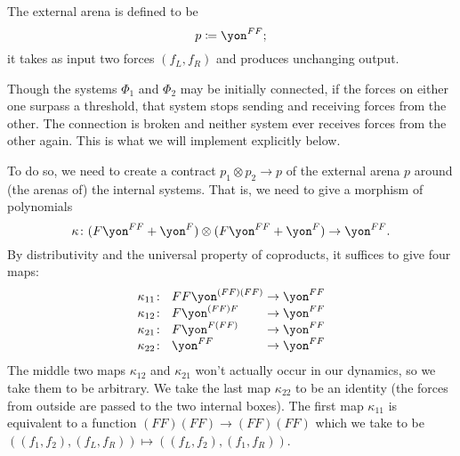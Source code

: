 \documentclass[Book-Poly]{subfiles}
\begin{document}
\begin{example}
The external arena is defined to be
\[
p\coloneqq\yon^{FF};
\]
it takes as input two forces $(f_L, f_R)$ and produces unchanging output.

Though the systems $\Phi_1$ and $\Phi_2$ may be initially connected, if the forces on either one surpass a threshold, that system stops sending and receiving forces from the other. The connection is broken and neither system ever receives forces from the other again. This is what we will implement explicitly below.

To do so, we need to create a contract $p_1\otimes p_2\to p$ of the external arena $p$ around (the arenas of) the internal systems. That is, we need to give a morphism of polynomials
\[
\kappa\colon (F\yon^{FF}+\yon^F)\otimes (F\yon^{FF}+\yon^F)\to\yon^{FF}.
\]
By distributivity and the universal property of coproducts, it suffices to give four maps:
\[\arraycolsep=1.4pt
\begin{array}{lll}
	\kappa_{11}\colon&~ FF\yon^{(FF)(FF)}&\to\yon^{FF}\\
	\kappa_{12}\colon&~ F\yon^{(FF)F}&\to\yon^{FF}\\
	\kappa_{21}\colon&~ F\yon^{F(FF)}&\to\yon^{FF}\\
	\kappa_{22}\colon&~ \yon^{FF}&\to\yon^{FF}
\end{array}
\]
The middle two maps $\kappa_{12}$ and $\kappa_{21}$ won't actually occur in our dynamics, so we take them to be arbitrary. We take the last map $\kappa_{22}$ to be an identity (the forces from outside are passed to the two internal boxes). The first map $\kappa_{11}$ is equivalent to a function $(FF)(FF)\to (FF)(FF)$ which we take to be $((f_1,f_2),(f_L,f_R))\mapsto((f_L, f_2),(f_1,f_R))$.


\end{example}
\end{document}
